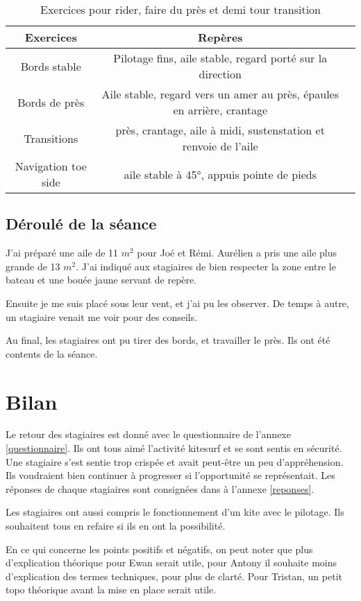 \documentclass[11pt,a4paper]{report}
\begin{document}
\begin{table}[h]
\begin{tabular}{|c|c|c|}
\hline
\textbf{Exercices}     &  \textbf{Repères}      \\
\hline 
Bords stable & Pilotage fins, aile stable, regard porté sur la direction   \\
\hline
Bords de près  & Aile stable, regard vers un amer au près, épaules en arrière, crantage  \\
\hline 
Transitions & près, crantage, aile à midi, sustenstation et renvoie de l'aile \\
\hline
Navigation toe side   &  aile stable à 45°, appuis pointe de pieds   \\
\hline
\end{tabular}
\caption{Exercices pour rider, faire du près et demi tour transition\label{seance_pilotage2}}
\end{table}

\subsection{Déroulé de la séance}
J'ai préparé une aile de 11 $m^2$ pour Joé et Rémi. Aurélien a pris une aile plus
grande de 13 $m^2$. J'ai indiqué aux stagiaires de bien respecter
la zone entre le bateau et une bouée jaune servant de repère.

Ensuite je me suis placé sous leur vent, et j'ai pu les observer. 
De temps à autre, un stagiaire venait me voir pour des conseils.

Au final, les stagiaires ont pu tirer des bords, et travailler le près. Ils ont été contents de la séance.
\section{Bilan}
Le retour des stagiaires est donné avec le questionnaire de l'annexe \ref{questionnaire}.
Ils ont tous aimé l'activité kitesurf et se sont sentis en sécurité.
Une stagiaire s'est sentie trop crispée et avait peut-\^etre un peu d'appréhension.
Ils  voudraient bien continuer à progresser si l'opportunité se représentait.
Les réponses de chaque stagiaires sont consignées dans à l'annexe \ref{reponses}.

Les stagiaires ont aussi compris le fonctionnement d'un kite avec le pilotage.
Ils souhaitent tous en refaire si ils en ont la possibilité.

En ce qui concerne les points positifs et négatifs, on peut noter
que plus d'explication théorique pour Ewan serait utile, pour Antony
il souhaite moins d'explication des termes techniques, pour plus de clarté.
Pour Tristan, un petit topo théorique avant la mise en place serait utile.
\end{document}
